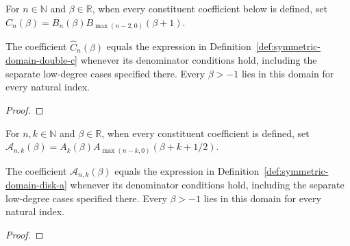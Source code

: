 \begin{supporting}
\begin{definition}
\label{def:symmetric-domain-double-c}
\leanok
For $n\in\mathbb N$ and $\beta\in\mathbb R$, when every constituent coefficient below is defined, set $\widehat C_n(\beta)=B_n(\beta)B_{\max(n-2,0)}(\beta+1)$.
\end{definition}

\begin{theorem}
\label{thm:symmetric-domain-double-c}
\leanok
The coefficient $\widehat C_n(\beta)$ equals the expression in Definition~\ref{def:symmetric-domain-double-c} whenever its denominator conditions hold, including the separate low-degree cases specified there.
Every $\beta>-1$ lies in this domain for every natural index.
\end{theorem}
\begin{proof}
\leanok
\end{proof}

\begin{definition}
\label{def:symmetric-domain-disk-a}
\leanok
For $n,k\in\mathbb N$ and $\beta\in\mathbb R$, when every constituent coefficient is defined, set $\mathcal A_{n,k}(\beta)=A_k(\beta)A_{\max(n-k,0)}(\beta+k+1/2)$.
\end{definition}

\begin{theorem}
\label{thm:symmetric-domain-disk-a}
\leanok
The coefficient $\mathcal A_{n,k}(\beta)$ equals the expression in Definition~\ref{def:symmetric-domain-disk-a} whenever its denominator conditions hold, including the separate low-degree cases specified there.
Every $\beta>-1$ lies in this domain for every natural index.
\end{theorem}
\begin{proof}
\leanok
\end{proof}


\end{supporting}
